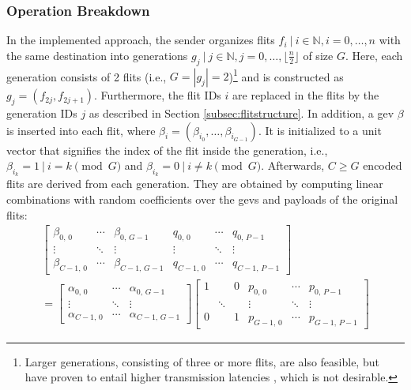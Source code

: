 \subsubsection{Operation Breakdown}
In the implemented approach, the sender organizes flits $f_i\ |\ i \in \mathbb{N}, i = 0, …, n$ with the same destination into generations $g_j\ |\ j
\in \mathbb{N}, j = 0, …, \lfloor\frac{n}{2}\rfloor$ of size $G$. Here, each generation consists of 2 flits (i.e., $G = |g_j| = 2$)\footnote{Larger
generations, consisting of three or more flits, are also feasible, but have proven to entail higher transmission latencies \cite[2]{moriam18activeattackers}, which
is not desirable.} and is constructed as $g_j = (f_{2j}, f_{2j+1})$. Furthermore, the flit IDs $i$ are replaced in the flits by the generation IDs $j$
as described in Section \ref{subsec:flitstructure}. In addition, a \gls{gev} $\beta$ is inserted into each flit, where $\beta_{i} = (\beta_{i_0}, …,
\beta_{i_{G-1}})$. It is initialized to a unit vector \cite[3]{chou03practicalnc} that signifies the index of the flit inside the generation, i.e.,
$\beta_{i_k} = 1\ |\ i = k \pmod G$ and $\beta_{i_k} = 0\ |\ i \neq k \pmod G$. Afterwards, $C \geq G$ encoded flits are derived from each generation.
They are obtained by computing linear combinations with random coefficients \cite[cf.][]{ho03randomcoding} over the \glspl{gev} and payloads of the
original flits:
\begin{equation}
    \begin{split}
        \begin{bmatrix}
            \beta_{0,\,0} & \cdots & \beta_{0,\,G-1} & q_{0,\,0} & \cdots & q_{0,\,P-1} \\
            \vdots & \ddots & \vdots & \vdots & \ddots & \vdots \\
            \beta_{C-1,\,0} & \cdots & \beta_{C-1,\,G-1} & q_{C-1,\,0} & \cdots & q_{C-1,\,P-1}
        \end{bmatrix}\\
        =
        \begin{bmatrix}
            \alpha_{0,\,0} & \cdots & \alpha_{0,\,G-1} \\
            \vdots & \ddots & \vdots \\
            \alpha_{C-1,\,0} & \cdots & \alpha_{C-1,\,G-1}
        \end{bmatrix}
        \begin{bmatrix}
            1 & & 0 & p_{0,\,0} & \cdots & p_{0,\,P-1} \\
            & \ddots & & \vdots & \ddots & \vdots \\
            0 & & 1 & p_{G-1,\,0} & \cdots & p_{G-1,\,P-1}
        \end{bmatrix}
    \end{split}
\end{equation}

